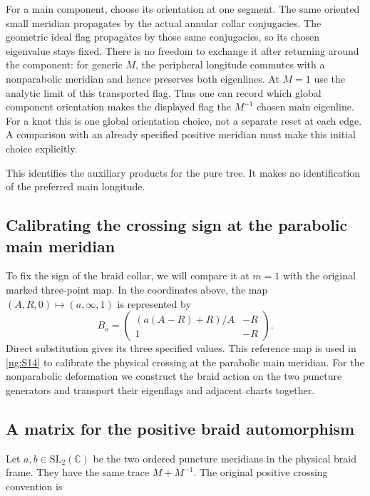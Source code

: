 For a main component, choose its orientation at one segment.
The same oriented small meridian propagates by the actual
annular collar conjugacies. The geometric ideal flag propagates
by those same conjugacies, so its chosen eigenvalue stays fixed.
There is no freedom to exchange it after returning around the
component: for generic \(M\), the peripheral longitude commutes
with a nonparabolic meridian and hence preserves both eigenlines.
At \(M=1\) use the analytic limit of this transported flag.
Thus one can record which global component orientation makes
the displayed flag the \(M^{-1}\) chosen main eigenline. For a knot this
is one global orientation choice, not a separate reset at each
edge. A comparison with an already specified positive
meridian must make this initial choice explicitly.

This identifies the auxiliary products for the pure tree. It makes no identification of the preferred main longitude.

\subsection{Calibrating the crossing sign at the parabolic main meridian}\label{ng:parabolic-reference-map}

To fix the sign of the braid collar, we will compare it at \(m=1\)
with the original marked three-point map. In the coordinates above,
the map \((A,R,0)\mapsto(a,\infty,1)\) is represented by
\begin{equation}\label{ng:S6}
 B_{\mathrm o}=
 \begin{pmatrix}(a(A-R)+R)/A&-R\\1&-R\end{pmatrix}.
\end{equation}
Direct substitution gives its three specified values. This reference
map is used in \eqref{ng:S14} to calibrate the physical crossing at
the parabolic main meridian. For the nonparabolic deformation we
construct the braid action on the two puncture generators and
transport their eigenflags and adjacent charts together.

\subsection{A matrix for the positive braid automorphism}\label{ng:a-regular-matrix-implementing-the-actual-positive-braid-collar}

Let \(a,b\in\mathrm{SL}_2(\mathbb C)\) be the two ordered
puncture meridians in the physical braid frame. They have the
same trace \(M+M^{-1}\). The original positive crossing
convention is

